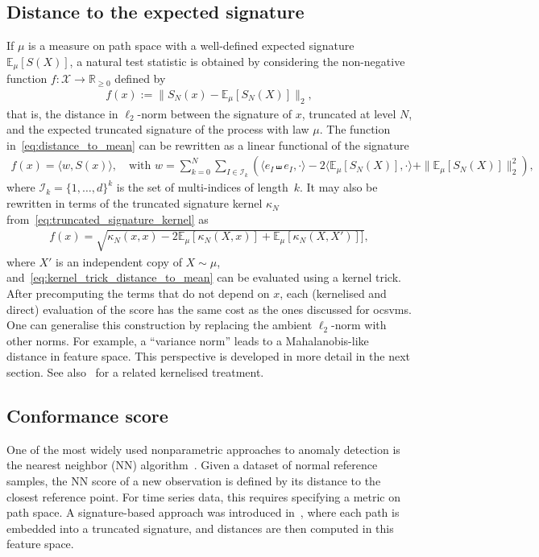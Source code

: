 \documentclass[twoside,11pt]{article}
\numberwithin{equation}{section}
\numberwithin{theorem}{section}
\newcommand{\R}{\mathbb{R}}
\newcommand{\X}{\mathcal{X}}
\newcommand{\ex}{\mathbb{E}}
\newcommand{\rkhsnorm}[1]{\|#1\|_{2}}
\begin{document}
\subsection{Distance to the expected signature}
If $\mu$ is a measure on path space with a well-defined expected signature $ \ex_{\mu} [S (X)]$, a natural test statistic is obtained by considering the non-negative function $f:\X\to \R_{\geq 0}$ defined by
\begin{align}\label{eq:distance_to_mean}
    f(x) := \rkhsnorm{S_N(x) - \ex_\mu [S_N(X)]},
\end{align}
that is, the distance in $\ell_2$-norm between the signature of \(x\), truncated at level $N$, and the expected truncated signature of the process with law \(\mu\). The function in~\eqref{eq:distance_to_mean} can be rewritten as a linear functional of the signature
\begin{align*}
    f(x)=\langle w, S(x)\rangle, 
    \quad\text{with } w = \sum_{k = 0}^{N} \sum_{I \in \mathcal{I}_k} \left(\langle e_I\shuffle  e_I, \cdot\rangle-
  2 \langle \ex_\mu [S_N(X)], \cdot \rangle + \rkhsnorm{\ex_\mu [S_N(X)]}^2\right),
\end{align*}
where $\mathcal{I}_k=\{1,\ldots,d\}^k$ is the set of multi-indices of length~$k$. 
It may also be rewritten in terms of the truncated signature kernel $\kappa_N$ from~\eqref{eq:truncated_signature_kernel} as 
\begin{align}\label{eq:kernel_trick_distance_to_mean}
    f(x)= \sqrt{\kappa_N(x,x)-2\ex_\mu[\kappa_N(X,x)]+\ex_{\mu}[\kappa_N(X,X')]]},
\end{align}
where \(X'\) is an independent copy of \(X\sim\mu\), and~\eqref{eq:kernel_trick_distance_to_mean} can be evaluated using a kernel trick. After precomputing the terms that do not depend on $x$, each (kernelised and direct) evaluation of the score has the same cost as the ones discussed for \glspl{ocsvm}.
One can generalise this construction by replacing the ambient $\ell_2$-norm with other norms. For example, a ``variance norm'' leads to a Mahalanobis-like distance in feature space. This perspective is developed in more detail in the next section. See also~\cite{cass2024variance} for a related kernelised treatment. 

\subsection{Conformance score}

One of the most widely used nonparametric approaches to anomaly detection is the nearest neighbor (NN) algorithm~\citep{bouman2024unsupervised}. 
Given a dataset of normal reference samples, the NN score of a new observation is defined by its distance to the closest reference point. 
For time series data, this requires specifying a metric on path space. 
A signature-based approach was introduced in~\citet{shao2020dimensionless}, where each path is embedded into a truncated signature, and distances are then computed in this feature space.  
\end{document}

